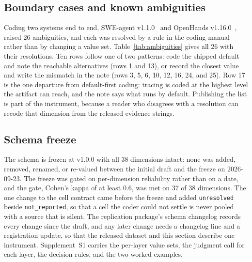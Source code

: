 \subsection{Boundary cases and known ambiguities}\label{subsec:ambiguities}

Coding two systems end to end, SWE-agent v1.1.0~\citep{yang2024sweagent} and OpenHands
v1.16.0~\citep{wang2024openhands}, raised 26 ambiguities, and each was resolved by a rule in the
coding manual rather than by changing a value set. Table~\ref{tab:ambiguities} gives all 26 with their
resolutions. Ten rows follow one of two patterns: code the shipped default and note the reachable
alternatives (rows 1 and 13), or record the closest value and write the mismatch in the note (rows 3, 5,
6, 10, 12, 16, 24, and 25). Row 17 is the one departure from default-first coding: tracing is
coded at the highest level the artifact can reach, and the note says what runs by default. Publishing
the list is part of the instrument, because a reader who disagrees with a resolution can recode that
dimension from the released evidence strings.


\subsection{Schema freeze}\label{subsec:freeze}

The schema is frozen at v1.0.0 with all 38 dimensions intact: none was added, removed, renamed, or
re-valued between the initial draft and the freeze on 2026-09-23. The freeze was gated on
per-dimension reliability rather than on a date, and the gate, Cohen's kappa of at least 0.6, was met on
37 of 38 dimensions. The one change to the cell contract came before the freeze and added
\texttt{unresolved} beside \texttt{not\_reported}, so that a cell the coder could not settle is never
pooled with a source that is silent. The replication package's schema changelog records every change
since the draft, and any later change needs a changelog line and a registration update, so that the
released dataset and this section describe one instrument. Supplement~S1 carries the
per-layer value sets, the judgment call for each layer, the decision rules, and the two worked examples.

